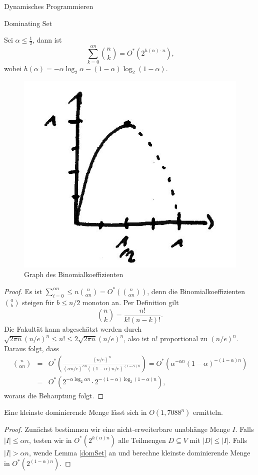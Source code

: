 \begin{chapter}{Dynamisches Programmieren}
\begin{section}{Dominating Set}
  \begin{lemma}[Hilfslemma]
    Sei $\alpha \leq \frac{1}{2}$, dann ist
    \[\sum_{k=0}^{\alpha n} \binom{n}{k} = O^*(2^{h(\alpha) \cdot n})\text{,}\]
    wobei $h(\alpha) = -\alpha\log_2 \alpha - (1-\alpha) \log_2 (1-\alpha)$.
      \begin{figure}[h]
	\centering
	\includegraphics[width=.25\textwidth]{./Bilder/b01.jpg}
	\caption{Graph des Binomialkoeffizienten}
      \end{figure}
  \end{lemma}
  \begin{proof}
    Es ist \( \sum_{i=0}^{\alpha n} \leq n \binom{n}{\alpha n} = O^*( \binom{n}{\alpha n} ) \), denn die Binomialkoeffizienten \( \binom{a}{b} \) steigen für \(b \leq n/2\) monoton an. Per Definition gilt 
    \[ \binom{n}{k} = \frac{n!}{k! (n-k)!}. \]
    Die Fakultät kann abgeschätzt werden durch \( \sqrt{2 \pi n} (n/e)^n \leq n! \leq 2 \sqrt{2 \pi n} (n/e)^n \), also ist \(n!\) proportional zu \((n/e)^n\). Daraus folgt, dass 
    \begin{eqnarray*}
      \binom{n}{\alpha n} &=& O^* \left( \frac{(n/e)^n}{(\alpha n/e)^{\alpha n} ( (1-\alpha)n/e)^{(1-\alpha) n}} \right) = O^* \left( \alpha^{-\alpha n} (1-\alpha)^{-(1-\alpha)n} \right) \\
      &=& O^* \left( 2^{-\alpha \log_2 \alpha n} \cdot 2^{-(1 - \alpha) \log_2(1-\alpha)n} \right),
    \end{eqnarray*}
    woraus die Behauptung folgt.
  \end{proof}

  \begin{theorem}
    Eine kleinste dominierende Menge lässt sich in \(O(1{,}7088^n)\) ermitteln.
  \end{theorem}
  \begin{proof}
    Zunächst bestimmen wir eine nicht-erweiterbare unabhänge Menge \(I\). 
    Falls \(|I| \leq \alpha n\), testen wir in \(O^*(2^{h(\alpha) n})\) alle Teilmengen \(D \subseteq V\) mit \(|D| \leq |I|\).
    Falls \(|I| > \alpha n\), wende Lemma \ref{domSet} an und berechne kleinste dominierende Menge in \(O^*(2^{(1-\alpha)n})\). %
    

\end{proof}
\end{section}
\end{chapter}
